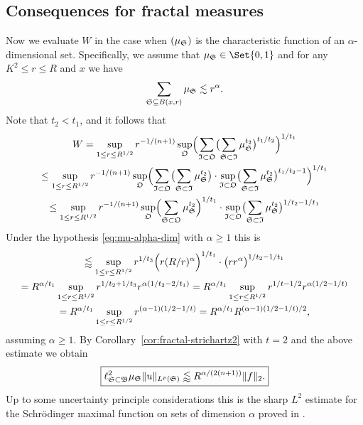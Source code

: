 \subsection{Consequences for fractal measures}
Now we evaluate $W$ in the case when $(\mu_{\mathfrak{S}})$ is the characteristic function of an $\alpha$-dimensional set.
Specifically, we assume that $\mu_{\bS} \in \Set{0,1}$ and for any $K^{2} \leq r \leq R$ and $x$ we have
\begin{equation}
\label{eq:mu-alpha-dim}
\sum_{\mathfrak{S} \subseteq B(x,r)} \mu_{\mathfrak{S}} \lesssim r^{\alpha}.
\end{equation}
Note that $t_{2} < t_{1}$, and it follows that
\begin{multline*}
W
=
\sup_{1 \leq r \leq R^{1/2}} r^{-1/(n+1)} \sup_{\mathfrak{O}} \Bigl( \sum_{\mathfrak{I} \subset \mathfrak{O}} \bigl( \sum_{\mathfrak{S} \subset \mathfrak{I}} \mu_{\mathfrak{S}}^{t_{2}} \bigr)^{t_{1}/t_{2}}  \Bigr)^{1/t_{1}}\\
\leq
\sup_{1 \leq r \leq R^{1/2}} r^{-1/(n+1)} \sup_{\mathfrak{O}} \Bigl( \sum_{\mathfrak{I} \subset \mathfrak{O}} \bigl( \sum_{\mathfrak{S} \subset \mathfrak{I}} \mu_{\mathfrak{S}}^{t_{2}} \bigr) \cdot \sup_{\mathfrak{I} \subset \mathfrak{O}} \bigl( \sum_{\mathfrak{S} \subset \mathfrak{I}} \mu_{\mathfrak{S}}^{t_{2}} \bigr)^{t_{1}/t_{2}-1}  \Bigr)^{1/t_{1}}\\
\leq
\sup_{1 \leq r \leq R^{1/2}} r^{-1/(n+1)} \sup_{\mathfrak{O}} \Bigl( \sum_{\mathfrak{S} \subset \mathfrak{O}} \mu_{\mathfrak{S}}^{t_{2}} \Bigr)^{1/t_{1}} \cdot \sup_{\mathfrak{I} \subset \mathfrak{O}} \bigl( \sum_{\mathfrak{S} \subset \mathfrak{I}} \mu_{\mathfrak{S}}^{t_{2}} \bigr)^{1/t_{2}-1/t_{1}}
\end{multline*}
Under the hypothesis \eqref{eq:mu-alpha-dim} with $\alpha\geq 1$ this is
\begin{multline*}
\lessapprox
\sup_{1 \leq r \leq R^{1/2}} r^{1/t_{3}} \Bigl( r (R/r)^{\alpha} \Bigr)^{1/t_{1}} \cdot \bigl( r r^{\alpha} \bigr)^{1/t_{2}-1/t_{1}}\\
=
R^{\alpha/t_{1}} \sup_{1 \leq r \leq R^{1/2}} r^{1/t_{2}+1/t_{3}} r^{\alpha(1/t_{2}-2/t_{1})}
=
R^{\alpha/t_{1}} \sup_{1 \leq r \leq R^{1/2}} r^{1/t-1/2} r^{\alpha(1/2-1/t)}\\
=
R^{\alpha/t_{1}} \sup_{1 \leq r \leq R^{1/2}} r^{(\alpha-1)(1/2-1/t)}
=
R^{\alpha/t_{1}} R^{(\alpha-1)(1/2-1/t)/2},
\end{multline*}
assuming $\alpha \geq 1$.
By Corollary~\ref{cor:fractal-strichartz2} with $t=2$ and the above estimate we obtain
\begin{equation}
\label{eq:max-frac-Schroedinger}
\boxed{\ell^{2}_{\mathfrak{S} \subset \mathfrak{B}} \mu_{\mathfrak{S}} \lVert u \rVert_{L^{p}(\mathfrak{S})}
\lessapprox
R^{\alpha/(2(n+1))} \lVert f\rVert_{2}.}
\end{equation}
Up to some uncertainty principle considerations this is the sharp $L^{2}$ estimate for the Schr\"odinger maximal function on sets of dimension $\alpha$ proved in \cite[Theorem 2.2]{arxiv:1805.02775}.

